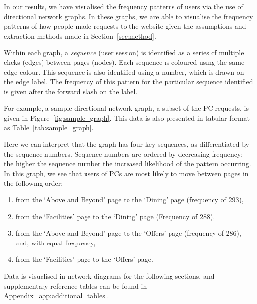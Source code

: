 
In our results, we have visualised the frequency patterns of users via the use of directional network graphs. In these graphs, we are able to visualise the frequency patterns of how people made requests to the website given the assumptions and extraction methods made in Section~\ref{sec:method}.

Within each graph, a \textit{sequence} (user session) is identified as a series of multiple clicks (edges) between pages (nodes). Each sequence is coloured using the same edge colour. This sequence is also identified using a number, which is drawn on the edge label. The frequency of this pattern for the particular sequence identified is given after the forward slash on the label.

For example, a sample directional network graph, a subset of the PC requests, is given in Figure~\ref{fig:sample_graph}. This data is also presented in tabular format as Table~\ref{tab:sample_graph}.

Here we can interpret that the graph has four key sequences, as differentiated by the sequence numbers. Sequence numbers are ordered by decreasing frequency; the higher the sequence number the increased likelihood of the pattern occurring. In this graph, we see that users of PCs are most likely to move between pages in the following order:

\begin{enumerate}
  \item from the `Above and Beyond' page to the `Dining' page (frequency of 293),
  \item from the `Facilities' page to the `Dining' page (Frequency of 288),
  \item from the `Above and Beyond' page to the `Offers' page (frequency of 286), and, with equal frequency,
  \item from the `Facilities' page to the `Offers' page.
\end{enumerate} 

Data is visualised in network diagrams for the following sections, and supplementary reference tables can be found in Appendix~\ref{app:additional_tables}.

\newpage


